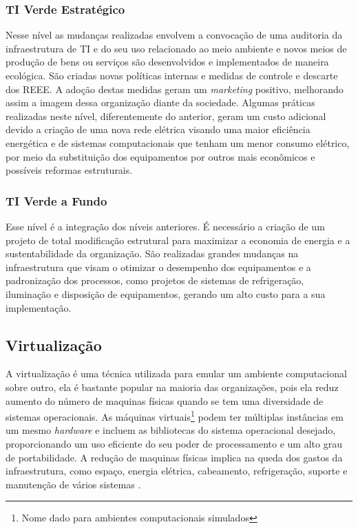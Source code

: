 \subsubsection{TI Verde Estratégico}

Nesse nível as mudanças realizadas envolvem a convocação de uma auditoria da infraestrutura de TI e do seu uso relacionado ao meio ambiente e novos meios de produção de bens ou serviços são desenvolvidos e implementados de maneira ecológica. São criadas novas políticas internas e medidas de controle e descarte dos REEE. A adoção destas medidas geram um \textit{marketing} positivo, melhorando assim a imagem dessa organização diante da sociedade. Algumas práticas realizadas neste nível, diferentemente do anterior, geram um custo adicional devido a criação de uma nova rede elétrica visando uma maior eficiência energética e de sistemas computacionais que tenham um menor consumo elétrico, por meio da substituição dos equipamentos por outros mais econômicos e possíveis reformas estruturais.

\subsubsection{TI Verde a Fundo}

Esse nível é a integração dos níveis anteriores. É necessário a criação de um projeto de total modificação estrutural para maximizar a economia de energia e a sustentabilidade da organização. São realizadas grandes mudanças na infraestrutura que visam o otimizar o desempenho dos equipamentos e a padronização dos processos, como projetos de sistemas de refrigeração, iluminação e disposição de equipamentos, gerando um alto custo para a sua implementação.

\subsection{Virtualização}

A virtualização é uma técnica utilizada para emular um ambiente computacional sobre outro, ela é bastante popular na maioria das organizações, pois ela reduz aumento do número de maquinas físicas quando se tem uma diversidade de sistemas operacionais. As máquinas virtuais\footnote{Nome dado para ambientes computacionais simulados} podem ter múltiplas instâncias em um mesmo \textit{hardware} e incluem as bibliotecas do sistema operacional desejado, proporcionando um uso eficiente do seu poder de processamento e um alto grau de portabilidade. A redução de maquinas físicas implica na queda dos gastos da infraestrutura, como espaço, energia elétrica, cabeamento, refrigeração, suporte e manutenção de vários sistemas \cite[p. 174-175]{carissimi2008virtualizaccao}.

